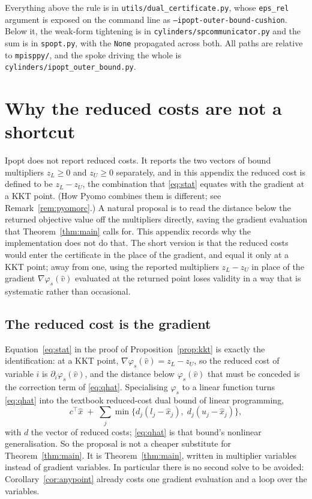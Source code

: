 \documentclass[11pt]{article}
\theoremstyle{plain}
\theoremstyle{remark}
\newcommand{\vhat}{\hat{v}}
\begin{document}
\noindent
Everything above the rule is in \texttt{utils/dual\_certificate.py},
whose \texttt{eps\_rel} argument is exposed on the command line as
\texttt{--ipopt-outer-bound-cushion}.  Below it, the weak-form tightening is in
\texttt{cylinders/spcommunicator.py} and the sum is in \texttt{spopt.py}, with
the \texttt{None} propagated across both.  All paths are relative to
\texttt{mpisppy/}, and the spoke driving the whole is
\texttt{cylinders/ipopt\_outer\_bound.py}.

\appendix

\section{Why the reduced costs are not a shortcut}\label{sec:reducedcost}

Ipopt does not report reduced costs.  It reports the two vectors of bound
multipliers $z_L \ge 0$ and $z_U \ge 0$ separately, and in this appendix the
reduced cost is defined to be $z_L - z_U$, the combination that
\eqref{eq:stat} equates with the gradient at a KKT point.  (How Pyomo combines
them is different; see Remark~\ref{rem:pyomorc}.)  A natural proposal is to
read the distance below the returned objective value off the multipliers
directly, saving the gradient
evaluation that Theorem~\ref{thm:main} calls for.  This appendix records why the
implementation does not do that.  The short version is that the reduced costs
would enter the certificate in the place of the gradient, and equal it only at a
KKT point; away from one, using the reported multipliers
$z_L - z_U$ in place of the gradient $\nabla \varphi_s(\vhat)$ evaluated at the
returned point loses validity in a way that is systematic rather than
occasional.

\subsection{The reduced cost is the gradient}

Equation~\eqref{eq:stat} in the proof of Proposition~\ref{prop:kkt} is exactly
the identification: at a KKT point,
$\nabla \varphi_s(\vhat) = z_L - z_U$, so the reduced cost of variable $i$ is
$\partial_i \varphi_s(\vhat)$, and the distance below $\varphi_s(\vhat)$ that
must be conceded is the correction term of \eqref{eq:qhat}.  Specialising
$\varphi_s$ to a linear function turns \eqref{eq:qhat} into the textbook
reduced-cost dual bound of linear programming,
\[
  c^{\top}\hat{x} \;+\; \sum_{j} \min\bigl\{ d_j (l_j - \hat{x}_j),\;
                                             d_j (u_j - \hat{x}_j) \bigr\},
\]
with $d$ the vector of reduced costs; \eqref{eq:qhat} is that bound's nonlinear
generalisation.  So the proposal is not a cheaper substitute for
Theorem~\ref{thm:main}.  It is Theorem~\ref{thm:main}, written in multiplier
variables instead of gradient variables.  In particular there is no second solve
to be avoided: Corollary~\ref{cor:anypoint} already costs one gradient
evaluation and a loop over the variables.
\end{document}
